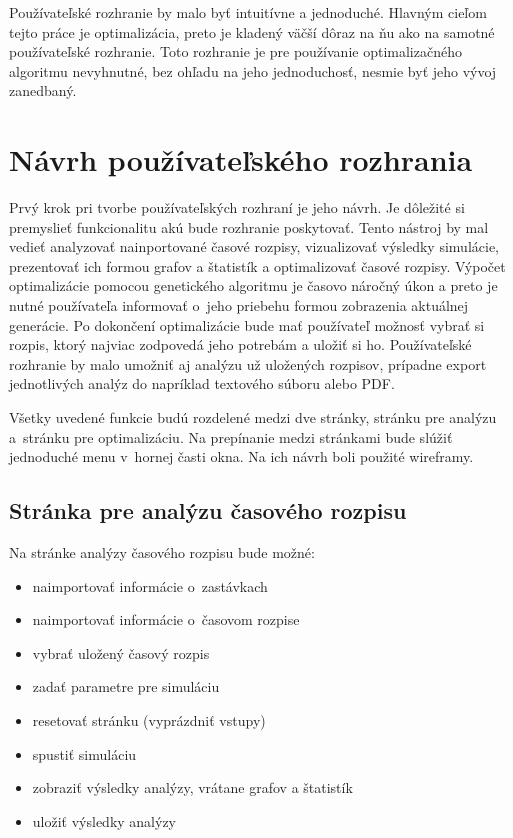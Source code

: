 Používateľské rozhranie by malo byť intuitívne a jednoduché.
Hlavným cieľom tejto práce je optimalizácia, preto je kladený väčší dôraz na ňu ako na samotné používateľské rozhranie.
Toto rozhranie je pre používanie optimalizačného algoritmu nevyhnutné, bez ohľadu na jeho jednoduchosť, nesmie byť jeho vývoj zanedbaný.

\section{Návrh používateľského rozhrania}\label{nastroj_uzivatelske_rozhranie}

Prvý krok pri tvorbe používateľských rozhraní je jeho návrh.
Je dôležité si premyslieť funkcionalitu akú bude rozhranie poskytovať.
Tento nástroj by mal vedieť analyzovať nainportované časové rozpisy, vizualizovať výsledky simulácie, prezentovať ich formou grafov a štatistík a optimalizovať časové rozpisy.
Výpočet optimalizácie pomocou genetického algoritmu je časovo náročný úkon a preto je nutné používateľa informovať o~jeho priebehu formou zobrazenia aktuálnej generácie.
Po dokončení optimalizácie bude mať používateľ možnosť vybrať si rozpis, ktorý najviac zodpovedá jeho potrebám a uložiť si ho.
Používateľské rozhranie by malo umožniť aj analýzu už uložených rozpisov, prípadne export jednotlivých analýz do napríklad textového súboru alebo PDF.

Všetky uvedené funkcie budú rozdelené medzi dve stránky, stránku pre analýzu a~stránku pre optimalizáciu.
Na prepínanie medzi stránkami bude slúžiť jednoduché menu v~hornej časti okna.
Na ich návrh boli použité wireframy.

\newpage
\subsection*{Stránka pre analýzu časového rozpisu}
Na stránke analýzy časového rozpisu bude možné:
\begin{itemize}
  \item naimportovať informácie o~zastávkach
  \item naimportovať informácie o~časovom rozpise
  \item vybrať uložený časový rozpis
  \item zadať parametre pre simuláciu
  \item resetovať stránku (vyprázdniť vstupy)
  \item spustiť simuláciu
  \item zobraziť výsledky analýzy, vrátane grafov a štatistík
  \item uložiť výsledky analýzy
\end{itemize}

